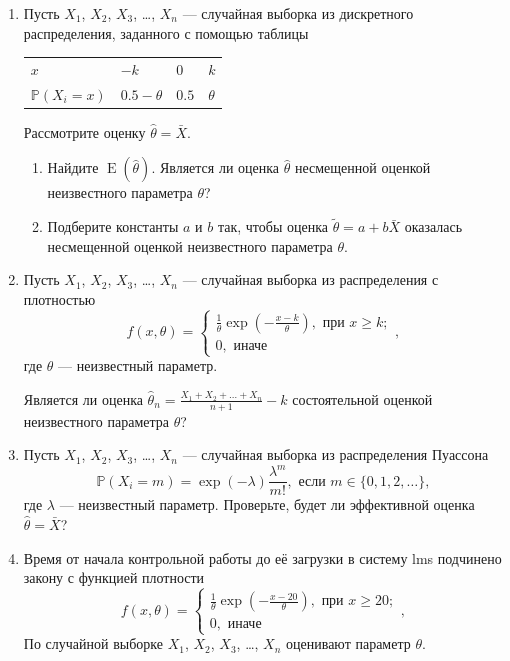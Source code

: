\documentclass[12pt]{article}
\DeclareMathOperator{\E}{E}
\def \P{\mathbb{P}}
\begin{document}
\begin{enumerate}

\item  Пусть $X_1$, $X_2$, $X_3$, \ldots, $X_n$ — случайная выборка из дискретного распределения, 
заданного с помощью таблицы

\begin{tabular}{@{}llll@{}}
  \toprule
   $x$           & $-k$ & $0$ & $k$ \\ 
   $\P(X_i = x)$ & $0.5-\theta$ & $0.5$ & $\theta$ \\
  \bottomrule
\end{tabular}
			
Рассмотрите оценку $\hat \theta = \bar X$.
\begin{enumerate}
\item Найдите $\E(\hat \theta)$. 
Является ли оценка $\hat \theta$ несмещенной оценкой неизвестного параметра $\theta$?
\item Подберите константы $a$ и $b$ так, 
чтобы оценка $\tilde \theta = a + b\bar X$ оказалась несмещенной оценкой неизвестного параметра $\theta$.
\end{enumerate} 



\item Пусть $X_1$, $X_2$, $X_3$, \ldots, $X_n$ — случайная выборка из распределения с плотностью
\[
  f(x, \theta) = \begin{cases}
    \frac{1}{\theta}\exp\left(-\frac{x-k}{\theta}\right), \text{ при } x\geq k; \\
    0, \text{ иначе}
  \end{cases},    
\]
где $\theta$ — неизвестный параметр.

Является ли оценка $\hat\theta_n = \frac{X_1 + X_2 + \ldots + X_n}{n+1} - k$ состоятельной оценкой неизвестного параметра $\theta$?


\item Пусть $X_1$, $X_2$, $X_3$, \ldots, $X_n$ 
— случайная выборка из распределения Пуассона
\[
\P(X_i = m) = \exp(-\lambda)\frac{\lambda^m}{m!}, \text{ если } m \in \{0, 1, 2, \ldots\},
\]
где $\lambda$ — неизвестный параметр. 
Проверьте, будет ли эффективной оценка $\hat\theta = \bar X$?


\item  Время от начала контрольной работы до её загрузки в систему lms  подчинено закону с функцией плотности
\[
  f(x, \theta) = \begin{cases}
    \frac{1}{\theta}\exp\left(-\frac{x-20}{\theta}\right), \text{ при } x\geq 20; \\
    0, \text{ иначе}
  \end{cases},    
\]
По случайной выборке $X_1$, $X_2$, $X_3$, \ldots, $X_n$ оценивают параметр $\theta$. 


\end{enumerate}
\end{document}
